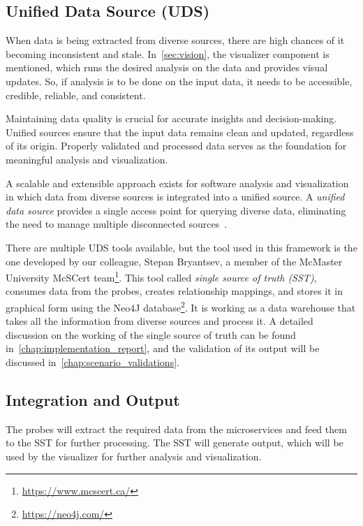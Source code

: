 \subsection{Unified Data Source (UDS)}\label{sec:component-sst}

When data is being extracted from diverse sources, there are high chances of it becoming inconsistent and stale. In~\autoref{sec:vision}, the visualizer component is mentioned, which runs the desired analysis on the data and provides visual updates. So, if analysis is to be done on the input data, it needs to be accessible, credible, reliable, and consistent.

Maintaining data quality is crucial for accurate insights and decision-making. Unified sources ensure that the input data remains clean and updated, regardless of its origin. Properly validated and processed data serves as the foundation for meaningful analysis and visualization.

A scalable and extensible approach exists for software analysis and visualization in which data from diverse sources is integrated into a unified source. A \textit{unified data source} provides a single access point for querying diverse data, eliminating the need to manage multiple disconnected sources~\citep{MullerUdsforSA2018}.

There are multiple UDS tools available, but the tool used in this framework is the one developed by our colleague, Stepan Bryantsev, a member of the McMaster University McSCert team\footnote{\url{https://www.mcscert.ca/}}. This tool called \textit{single source of truth (SST)}, consumes data from the probes, creates relationship mappings, and stores it in graphical form using the Neo4J database\footnote{\url{https://neo4j.com/}}. It is working as a data warehouse that takes all the information from diverse sources and process it. A detailed discussion on the working of the single source of truth can be found in~\autoref{chap:implementation_report}, and the validation of its output will be discussed in~\autoref{chap:scenario_validations}.

\subsection{Integration and Output}

The probes will extract the required data from the microservices and feed them to the SST for further processing. The SST will generate output, which will be used by the visualizer for further analysis and visualization.

